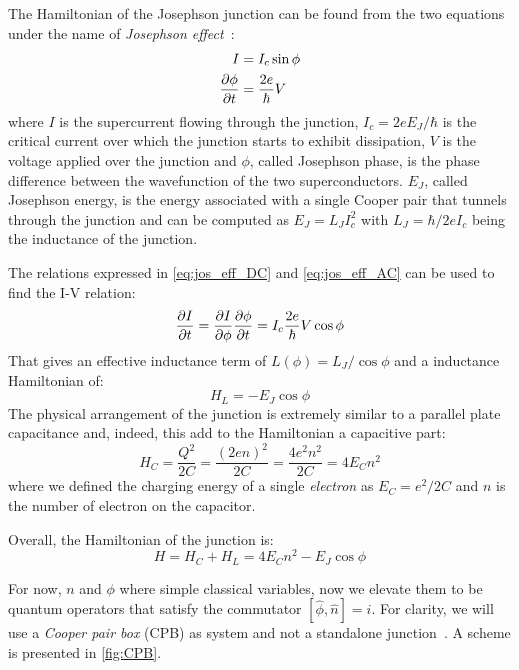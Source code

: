 The Hamiltonian of the Josephson junction can be found from the two equations under the name of \textit{Josephson effect}~\cite{FundamentalsAndFrontiersJosephsonEffect, Josephson1962}:
\begin{align}
    \label{eq:jos_eff_DC}
    I &= I_c \sin \phi \\
    \label{eq:jos_eff_AC}
    \frac{\partial \phi}{\partial t} &= \frac{2e}{\hbar}V
\end{align}
where $I$ is the supercurrent flowing through the junction, $I_c=2eE_J/\hbar$ is the critical current over which the junction starts to exhibit dissipation, $V$ is the voltage applied over the junction and $\phi$, called Josephson phase, is the phase difference between the wavefunction of the two superconductors. 
$E_J$, called Josephson energy, is the energy associated with a single Cooper pair that tunnels through the junction and can be computed as $E_J=L_J I_c^2$ with $L_J=\hbar/2eI_c$ being the inductance of the junction.

The relations expressed in \cref{eq:jos_eff_DC} and \cref{eq:jos_eff_AC} can be used to find the I-V relation:
\begin{equation}
    \frac{\partial I}{\partial t}=\frac{\partial I}{\partial \phi}\frac{\partial \phi}{\partial t} = I_c \frac{2e}{\hbar}V\cos\phi
\end{equation}
That gives an effective inductance term of $L(\phi)=L_J/\cos\phi$ and a inductance Hamiltonian of:
\begin{equation}
    H_L=-E_J\cos\phi
\end{equation}
The physical arrangement of the junction is extremely similar to a parallel plate capacitance and, indeed, this add to the Hamiltonian a capacitive part:
\begin{equation}
    H_C=\frac{Q^2}{2C}=\frac{(2en)^2}{2C} = \frac{4e^2n^2}{2C} = 4E_C n^2
\end{equation}
where we defined the charging energy of a single \textit{electron} as $E_C=e^2/2C$ and $n$ is the number of electron on the capacitor.

Overall, the Hamiltonian of the junction is:
\begin{equation}
    H=H_C+H_L=4E_Cn^2 - E_J \cos \phi
\end{equation}

For now, $n$ and $\phi$ where simple classical variables, now we elevate them to be quantum operators that satisfy the commutator $\left[\hat\phi,\hat n\right]=i$.
For clarity, we will use a \textit{Cooper pair box} (CPB) as system and not a standalone junction~\cite{Bladh2005}. A scheme is presented in \cref{fig:CPB}. 

